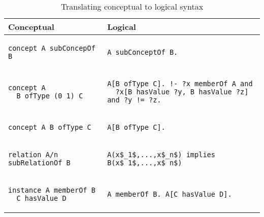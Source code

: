\begin{table}[ht]
  \centering
\footnotesize{
  \begin{tabular}{l|l}
    \textbf{Conceptual} & \textbf{Logical} \\
\hline
    \begin{lstlisting}[style=wsml-table]
concept A subConcepOf B
    \end{lstlisting}
    &
    \begin{lstlisting}[style=wsml-table]
A subConceptOf B.
    \end{lstlisting}
    \\
    \begin{lstlisting}[style=wsml-table]
concept A
  B ofType (0 1) C
    \end{lstlisting}
    &
    \begin{lstlisting}[style=wsml-table]
A[B ofType C]. !- ?x memberOf A and
  ?x[B hasValue ?y, B hasValue ?z] and ?y != ?z.
    \end{lstlisting}\\
    \begin{lstlisting}[style=wsml-table]
concept A B ofType C
    \end{lstlisting}
    &
    \begin{lstlisting}[style=wsml-table]
A[B ofType C].
    \end{lstlisting}\\
    \begin{lstlisting}[style=wsml-table]
relation A/n subRelationOf B
    \end{lstlisting}
    &
    \begin{lstlisting}[style=wsml-table]
A(x$_1$,...,x$_n$) implies B(x$_1$,...,x$_n$)
    \end{lstlisting}\\
    \begin{lstlisting}[style=wsml-table]
instance A memberOf B
  C hasValue D
    \end{lstlisting}
    &
    \begin{lstlisting}[style=wsml-table]
A memberOf B. A[C hasValue D].
    \end{lstlisting}\\
    \hline
  \end{tabular}}

  \caption{Translating conceptual to logical
    syntax}\label{tab:conceptual-logical}
\end{table}
